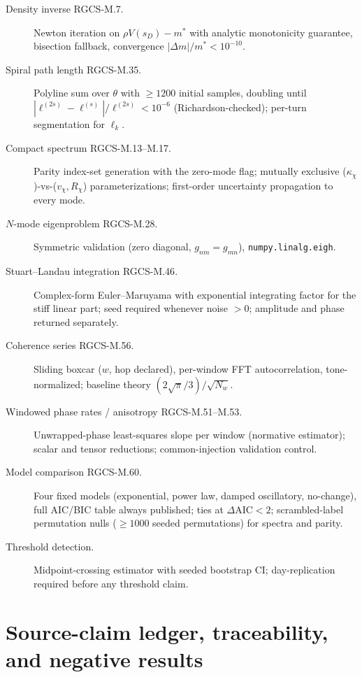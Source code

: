\documentclass[10pt,letterpaper]{article}
\newcommand{\eqid}[1]{\textcolor{inkgray}{\scriptsize\textsf{#1}}}
\newcommand{\Rchi}{R_{\chi}}
\newcommand{\vchi}{v_{\chi}}
\newcommand{\kchi}{\kappa_{\chi}}
\begin{document}
\begin{description}
\item[Density inverse \eqid{RGCS-M.7}.] Newton iteration on
$\rho V(s_D) - m^\ast$ with analytic monotonicity guarantee, bisection
fallback, convergence $|\Delta m|/m^\ast < 10^{-10}$.
\item[Spiral path length \eqid{RGCS-M.35}.] Polyline sum over $\theta$
with $\ge 1200$ initial samples, doubling until
$|\ell^{(2s)} - \ell^{(s)}|/\ell^{(2s)} < 10^{-6}$ (Richardson-checked);
per-turn segmentation for $\ell_k$.
\item[Compact spectrum \eqid{RGCS-M.13--M.17}.] Parity index-set
generation with the zero-mode flag; mutually exclusive
($\kchi$)-vs-($\vchi, \Rchi$) parameterizations; first-order uncertainty
propagation to every mode.
\item[$N$-mode eigenproblem \eqid{RGCS-M.28}.] Symmetric validation
(zero diagonal, $g_{nm} = g_{mn}$), \texttt{numpy.linalg.eigh}.
\item[Stuart--Landau integration \eqid{RGCS-M.46}.] Complex-form
Euler--Maruyama with exponential integrating factor for the stiff linear
part; seed required whenever noise $> 0$; amplitude and phase returned
separately.
\item[Coherence series \eqid{RGCS-M.56}.] Sliding boxcar
($w$, hop declared), per-window FFT autocorrelation, tone-normalized;
baseline theory $(2\sqrt{\pi}/3)/\sqrt{N_w}$.
\item[Windowed phase rates / anisotropy \eqid{RGCS-M.51--M.53}.]
Unwrapped-phase least-squares slope per window (normative estimator);
scalar and tensor reductions; common-injection validation control.
\item[Model comparison \eqid{RGCS-M.60}.] Four fixed models
(exponential, power law, damped oscillatory, no-change), full AIC/BIC
table always published; ties at $\Delta\mathrm{AIC} < 2$; scrambled-label
permutation nulls ($\ge 1000$ seeded permutations) for spectra and parity.
\item[Threshold detection.] Midpoint-crossing estimator with seeded
bootstrap CI; day-replication required before any threshold claim.
\end{description}

\section{Source-claim ledger, traceability, and negative results}\label{app:ledger}
\end{document}
